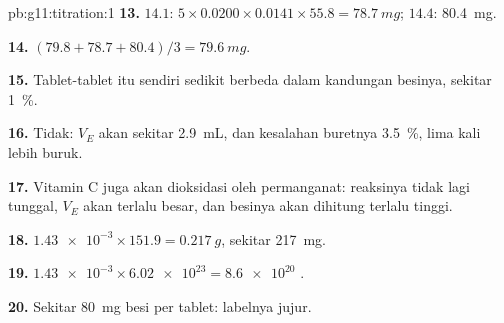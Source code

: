 \begin{solution}{pb:g11:titration:1}
\textbf{13.} $14.1$: $5 \times 0.0200 \times 0.0141 \times 55.8 =
\qty{78.7}{mg}$; $14.4$: \qty{80.4}{mg}.

\textbf{14.} $(79.8 + 78.7 + 80.4)/3 = \qty{79.6}{mg}$.

\textbf{15.} Tablet-tablet itu sendiri sedikit berbeda dalam kandungan
besinya, sekitar \qty{1}{\percent}.

\textbf{16.} Tidak: $V_E$ akan sekitar \qty{2.9}{mL}, dan kesalahan
buretnya \qty{3.5}{\percent}, lima kali lebih buruk.

\textbf{17.} Vitamin C juga akan dioksidasi oleh permanganat: reaksinya
tidak lagi tunggal, $V_E$ akan terlalu besar, dan besinya akan
dihitung terlalu tinggi.

\textbf{18.} $\num{1.43e-3} \times 151.9 = \qty{0.217}{g}$, sekitar
\qty{217}{mg}.

\textbf{19.} $\num{1.43e-3} \times \num{6.02e23} = \num{8.6e20}$ .

\textbf{20.} Sekitar \qty{80}{mg} besi per tablet: labelnya jujur.
\end{solution}
